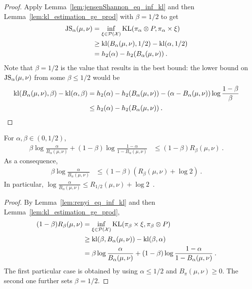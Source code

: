 \begin{proof}%
{}
Apply Lemma~\ref{lem:jensenShannon_eq_inf_kl} and then Lemma~\ref{lem:kl_estimation_ge_prod} with $\beta = 1/2$ to get
\begin{align*}
\operatorname{JS}_\alpha(\mu, \nu)
&= \inf_{\xi \in \mathcal P(\mathcal X)}\operatorname{KL}(\pi_\alpha \otimes P, \pi_\alpha \times \xi)
\\
&\ge \operatorname{kl}(B_\alpha(\mu, \nu), 1/2) - \operatorname{kl}(\alpha, 1/2)
\\
&= h_2(\alpha) - h_2(B_\alpha(\mu, \nu)) \: .
\end{align*}
Note that $\beta = 1/2$ is the value that results in the best bound: the lower bound on $\operatorname{JS}_\alpha(\mu, \nu)$ from some $\beta \le 1/2$ would be
\begin{align*}
\operatorname{kl}(B_\alpha(\mu, \nu), \beta) - \operatorname{kl}(\alpha, \beta)
&= h_2(\alpha) - h_2(B_\alpha(\mu, \nu)) - (\alpha - B_\alpha(\mu, \nu)) \log \frac{1 - \beta}{\beta}
\\
&\le h_2(\alpha) - h_2(B_\alpha(\mu, \nu)) \: .
\end{align*}

\end{proof}


\begin{theorem}
  \label{thm:log_inv_bayesBinaryRisk_le_renyi}
  For $\alpha, \beta \in (0, 1/2)$,
  \begin{align*}
  \beta \log\frac{\alpha}{B_\alpha(\mu, \nu)} + (1 - \beta) \log\frac{1 - \alpha}{1 - B_\alpha(\mu, \nu)}
  &\le (1 - \beta) R_{\beta}(\mu, \nu)
  \: .
  \end{align*}
  As a consequence,
  \begin{align*}
  \beta \log\frac{\alpha}{B_\alpha(\mu, \nu)}
  &\le (1 - \beta) (R_{\beta}(\mu, \nu) + \log 2)
  \: .
  \end{align*}
  In particular, $\log\frac{\alpha}{B_\alpha(\mu, \nu)} \le R_{1/2}(\mu, \nu) + \log 2$~.
\end{theorem}

\begin{proof}%
{}
By Lemma~\ref{lem:renyi_eq_inf_kl} and then Lemma~\ref{lem:kl_estimation_ge_prod},
\begin{align*}
(1 - \beta) R_{\beta}(\mu, \nu)
&= \inf_{\xi \in \mathcal P(\mathcal X)} \operatorname{KL}(\pi_\beta \times \xi, \pi_\beta \otimes P)
\\
&\ge \operatorname{kl}(\beta, B_\alpha(\mu, \nu)) - \operatorname{kl}(\beta, \alpha)
\\
&= \beta \log\frac{\alpha}{B_\alpha(\mu, \nu)} + (1 - \beta)\log\frac{1 - \alpha}{1 - B_\alpha(\mu, \nu)}
\: .
\end{align*}
The first particular case is obtained by using $\alpha \le 1/2$ and $B_\pi(\mu, \nu) \ge 0$.
The second one further sets $\beta = 1/2$.
\end{proof}


